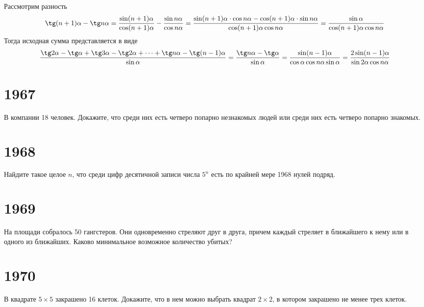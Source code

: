 \documentclass[11pt, a4paper]{common/document_template}
\begin{document}
\begin{Solution}
Рассмотрим разность
$$
\tg (n+1)\alpha - \tg n\alpha = \frac{\sin(n+1)\alpha}{\cos(n+1)\alpha} - \frac{\sin n\alpha}{\cos n\alpha} = \frac{\sin(n+1)\alpha \cdot \cos n\alpha -\cos(n+1)\alpha \cdot \sin n\alpha}{\cos(n+1)\alpha\cos n\alpha} = \frac{\sin \alpha}{\cos(n+1)\alpha\cos n\alpha}
$$
Тогда исходная сумма представляется в виде
$$
\frac{\tg 2\alpha - \tg \alpha + \tg 3\alpha - \tg 2\alpha + \dots + \tg n\alpha - \tg (n-1)\alpha}{\sin \alpha} = \frac{\tg n\alpha - \tg \alpha}{\sin\alpha} = \frac{\sin(n-1)\alpha}{\cos\alpha\cos n\alpha\sin\alpha} = \frac{2\sin(n-1)\alpha}{\sin 2\alpha \cos n\alpha}
$$
\end{Solution}

\chapter{1967}

\begin{exercise}
В компании 18 человек. Докажите, что среди них есть четверо попарно незнакомых людей или среди них есть четверо попарно знакомых.
\end{exercise}

\chapter{1968}

\begin{exercise}[36]
Найдите такое целое $n$, что среди цифр десятичной записи числа $5^{n}$ есть по крайней мере 1968 нулей подряд.
\end{exercise}

\chapter{1969}

\begin{exercise}[32]
На площади собралось 50 гангстеров. Они одновременно стреляют друг в друга, причем каждый стреляет в ближайшего к нему или в одного из ближайших. Каково минимальное возможное количество убитых?
\end{exercise}

\chapter{1970}

\begin{exercise}[16]
В квадрате $5 \times 5$ закрашено 16 клеток. Докажите, что в нем можно выбрать квадрат $2 \times 2$, в котором закрашено не менее трех клеток.
\end{exercise}
\end{document}
